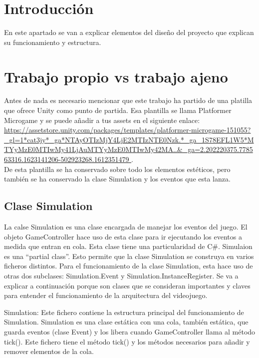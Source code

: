 
\section{Introducción}
En este apartado se van a explicar elementos del diseño del proyecto que explican su funcionamiento y estructura.

\section{Trabajo propio vs trabajo ajeno}
Antes de nada es necesario mencionar que este trabajo ha partido de una platilla que ofrece Unity como punto de partida. Esa plantilla se llama Platformer Microgame y se puede añadir a tus assets en el siguiente enlace:\\
 \url{https://assetstore.unity.com/packages/templates/platformer-microgame-151055?_gl=1*cat3jy*_ga*NTAyOTIzMjY4LjE2MTIzNTE0Nzk.*_ga_1S78EFL1W5*MTYyMzE0MTIwMy41LjAuMTYyMzE0MTIwMy42MA..&_ga=2.202220375.778563316.1623141206-502923268.1612351479
}.\\ 
De esta plantilla se ha conservado sobre todo los elementos estéticos, pero también se ha conservado la clase Simulation y los eventos que esta lanza.

\subsection{Clase Simulation}
La calse Simulation es una clase encargada de manejar los eventos del juego. El objeto GameController hace uso de esta clase para ir ejecutando los eventos a medida que entran en cola. Esta clase tiene una particularidad de C\#. Simulaion es una “partial class”. Esto permite que la clase Simulation se construya en varios ficheros distintos. Para el funcionamiento de la clase Simulation, esta hace uso de otras dos subclases: Simulation.Event y Simulation.InstanceRegister. Se va a explicar a continuación porque son clases que se consideran importantes y claves para entender el funcionamiento de la arquitectura del videojuego.

Simulation: Este fichero contiene la estructura principal del funcionamiento de Simulation. Simulation es una clase estática con una cola, también estática, que guarda eventos (clase Event) y los libera cuando GameController llama al método tick(). Este fichero tiene el método tick() y los métodos necesarios para añadir y remover elementos de la cola. 

